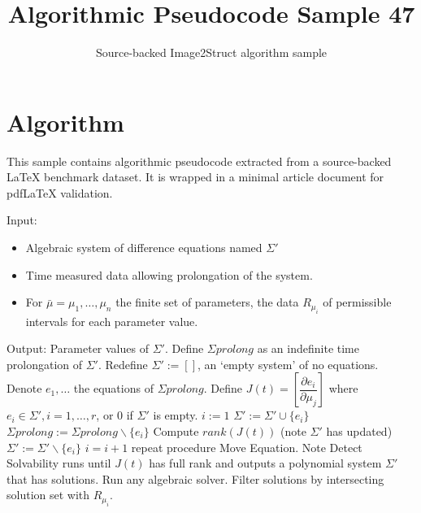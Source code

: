 \documentclass[11pt]{article}
\title{Algorithmic Pseudocode Sample 47}
\author{Source-backed Image2Struct algorithm sample}
\date{}
\begin{document}
\maketitle
\section{Algorithm}
This sample contains algorithmic pseudocode extracted from a source-backed LaTeX benchmark dataset. It is wrapped in a minimal article document for pdfLaTeX validation.

\begin{algorithm}[htbp]
\caption{Source-backed algorithmic procedure}
\begin{algorithm}
[H]
\caption{Square system method}
\begin{algorithmic}[1]
\State Input:\begin{itemize}
\item Algebraic system of difference equations named $\Sigma'$
\item Time measured data allowing prolongation of the system.
\item For $\bar{\mu}=\mu_1,\ldots,\mu_n$ the finite set of parameters, the data $R_{\mu_i}$ of permissible intervals for each parameter value.
\end{itemize}
\State Output: Parameter values of $\Sigma'$.
\State Define $\Sigma prolong$ as an indefinite time prolongation of $\Sigma'$.
\State Redefine $\Sigma':=[]$, an `empty system' of no equations.
\State Denote $e_1,\ldots$ the equations of $\Sigma prolong$.
\State Define $J(t)=\left[\dfrac{\partial e_i}{\partial\mu_j}\right]$ where $e_i\in \Sigma',i=1,\ldots,r$, or 0 if $\Sigma'$ is empty.
\State $i:=1$
\State $\Sigma':=\Sigma'\cup\{e_i\}$
\State $\Sigma prolong:=\Sigma prolong\backslash\{e_i\}$
\State Compute $rank(J(t))$ (note $\Sigma'$ has updated)
 $\Sigma':=\Sigma'\backslash\{e_i\}$
\EndIf
\State $i=i+1$
 repeat procedure Move Equation.
\EndIf
\EndProcedure
\EndFor
{} Note Detect Solvability runs until $J(t)$ \phantom{---------}has full rank and outputs a polynomial system $\Sigma'$ that has solutions. Run any \phantom{---------}algebraic solver.
\State Filter solutions by intersecting solution set with $R_{\mu_i}$.
\EndProcedure
\EndProcedure
\end{algorithmic}
\end{algorithm}
\end{algorithm}
\end{document}
